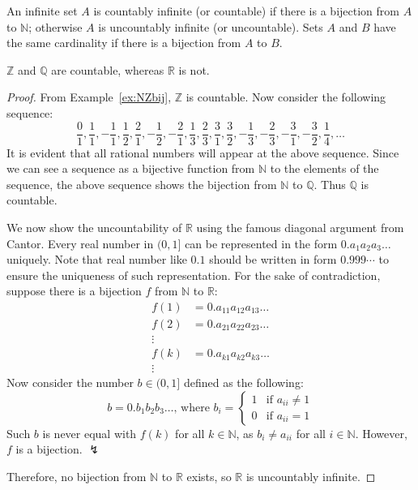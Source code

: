 \documentclass[../main.tex]{subfiles}
\begin{document}
\begin{defn}
    An infinite set $A$ is \textsf{countably infinite} (or \textsf{countable}) if there is a bijection from $A$ to $\mathbb N$; otherwise $A$ is \textsf{uncountably infinite} (or \textsf{uncountable}).
    Sets $A$ and $B$ have the same \textsf{cardinality} if there is a bijection from $A$ to $B$.
\end{defn}

\begin{ex}
    $\mathbb Z$ and $\mathbb Q$ are countable, whereas $\mathbb R$ is not.
\end{ex}
\begin{proof}
    From Example~\ref{ex:NZbij}, $\mathbb Z$ is countable.
    Now consider the following sequence:
    \[
        \frac 01, \frac 11, -\frac 11, \frac 12, \frac 21, -\frac 12, -\frac 21, \frac 13, \frac 23, \frac 31, \frac 32, -\frac 13, -\frac 23, -\frac 31, -\frac 32, \frac 14, \dots
    \]
    It is evident that all rational numbers will appear at the above sequence.
    Since we can see a sequence as a bijective function from $\mathbb N$ to the elements of the sequence, the above sequence shows the bijection from $\mathbb N$ to $\mathbb Q$.
    Thus $\mathbb Q$ is countable.
    
    We now show the uncountability of $\mathbb R$ using the famous diagonal argument from Cantor.
    Every real number in $(0, 1]$ can be represented in the form $0.a_1 a_2 a_3 \dots$ uniquely.
    Note that real number like $0.1$ should be written in form $0.999\cdots$ to ensure the uniqueness of such representation.
    For the sake of contradiction, suppose there is a bijection $f$ from $\mathbb{N}$ to $\mathbb{R}$:
    \begin{align*}
        f(1) &= 0.a_{11} a_{12} a_{13} \dots\\
        f(2) &= 0.a_{21} a_{22} a_{23} \dots\\
        \vdots \\
        f(k) &= 0.a_{k1} a_{k2} a_{k3} \dots\\
        \vdots
    \end{align*}
    Now consider the number $b \in (0, 1]$ defined as the following:
    \[
        b = 0.b_1 b_2 b_3 \dots \text{, where } b_i = \begin{cases}
            1 &\text{if } a_{ii} \neq 1\\
            0 &\text{if } a_{ii} = 1
        \end{cases}
    \]
    Such $b$ is never equal with $f(k)$ for all $k \in \mathbb N$, as $b_i \neq a_{ii}$ for all $i \in \mathbb N$.
    However, $f$ is a bijection. $\lightning$
    
    Therefore, no bijection from $\mathbb N$ to $\mathbb R$ exists, so $\mathbb R$ is uncountably infinite.
\end{proof}
\end{document}
